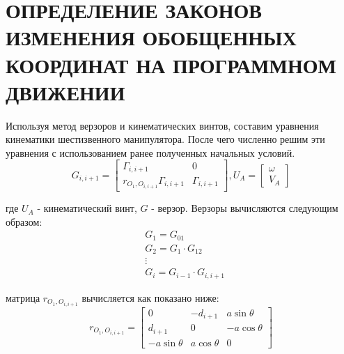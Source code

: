 \chapter{\MakeUppercase{ОПРЕДЕЛЕНИЕ ЗАКОНОВ ИЗМЕНЕНИЯ ОБОБЩЕННЫХ КООРДИНАТ НА ПРОГРАММНОМ ДВИЖЕНИИ}}

Используя метод верзоров и кинематических винтов, составим уравнения кинематики шестизвенного манипулятора. После чего численно решим эти уравнения с использованием ранее полученных начальных условий.
$$ G_{i, i+1} =\begin{bmatrix}
    \Gamma_{i, i+1} & 0 \\
    r_{O_1, O_{i, i+1}} \Gamma_{i, i+1} & \Gamma_{i, i+1}
\end{bmatrix}, U_A = \begin{bmatrix}
    \omega \\
    V_A
\end{bmatrix} $$

\noindent где $ U_A $ - кинематический винт, $ G $ - верзор. Верзоры вычисляются следующим образом: 
\begin{align*}
    & G_1 = G_{01} \\
    & G_2 = G_1 \cdot G_{12} \\
    & \vdots \\
    & G_i = G_{i-1} \cdot G_{i, i+1}
\end{align*}

\noindent матрица $ r_{O_1, O_{i, i+1}} $ вычисляется как показано ниже:
$$ r_{O_1, O_{i, i+1}} = \begin{bmatrix}
    0 & -d_{i+1} & a \sin \theta \\
    d_{i+1} & 0 & -a \cos \theta \\
    -a \sin \theta & a \cos \theta & 0
\end{bmatrix} $$